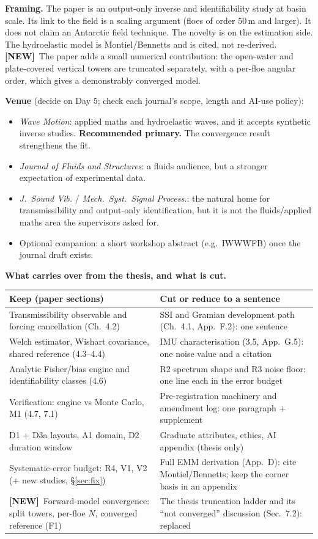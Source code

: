 \documentclass[10pt,a4paper]{article}
\newcommand{\NEW}{\textcolor{ocean}{\textbf{[NEW]}}}
\begin{document}
\textbf{Framing.} The paper is an output-only inverse and identifiability study at basin scale. Its link to the field is a scaling argument (floes of order 50\,m and larger). It does not claim an Antarctic field technique. The novelty is on the estimation side. The hydroelastic model is Montiel/Bennetts and is cited, not re-derived. \NEW\ The paper adds a small numerical contribution: the open-water and plate-covered vertical towers are truncated separately, with a per-floe angular order, which gives a demonstrably converged model.

\textbf{Venue} (decide on Day 5; check each journal's scope, length and AI-use policy):
\begin{itemize}
\item \emph{Wave Motion}: applied maths and hydroelastic waves, and it accepts synthetic inverse studies. \textbf{Recommended primary.} The convergence result strengthens the fit.
\item \emph{Journal of Fluids and Structures}: a fluids audience, but a stronger expectation of experimental data.
\item \emph{J.\ Sound Vib.} / \emph{Mech.\ Syst.\ Signal Process.}: the natural home for transmissibility and output-only identification, but it is not the fluids/applied maths area the supervisors asked for.
\item Optional companion: a short workshop abstract (e.g.\ IWWWFB) once the journal draft exists.
\end{itemize}

\textbf{What carries over from the thesis, and what is cut.}

\begin{center}\small
\begin{tabularx}{\linewidth}{@{}L L@{}}
\toprule
Keep (paper sections) & Cut or reduce to a sentence \\
\midrule
Transmissibility observable and forcing cancellation (Ch.~4.2) & SSI and Gramian development path (Ch.~4.1, App.~F.2): one sentence \\
Welch estimator, Wishart covariance, shared reference (4.3--4.4) & IMU characterisation (3.5, App.~G.5): one noise value and a citation \\
Analytic Fisher/bias engine and identifiability classes (4.6) & R2 spectrum shape and R3 noise floor: one line each in the error budget \\
Verification: engine vs Monte Carlo, M1 (4.7, 7.1) & Pre-registration machinery and amendment log: one paragraph + supplement \\
D1 + D3a layouts, A1 domain, D2 duration window & Graduate attributes, ethics, AI appendix (thesis only) \\
Systematic-error budget: R4, V1, V2 (+ new studies, \S\ref{sec:fix}) & Full EMM derivation (App.~D): cite Montiel/Bennetts; keep the corner basis in an appendix \\
\NEW\ Forward-model convergence: split towers, per-floe $N$, converged reference (F1) & The thesis truncation ladder and its ``not converged'' discussion (Sec.~7.2): replaced \\
\bottomrule
\end{tabularx}
\end{center}
\end{document}
